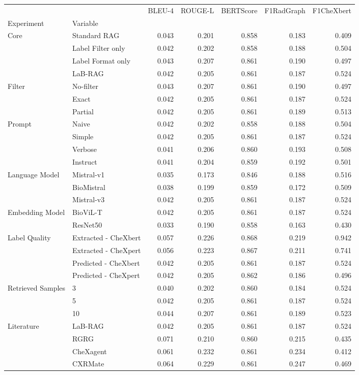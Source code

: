 \begin{tabular}{llrrrrr}
\toprule
 &  & BLEU-4 & ROUGE-L & BERTScore & F1RadGraph & F1CheXbert \\
Experiment & Variable &  &  &  &  &  \\
\midrule
\multirow[t]{4}{*}{Core} & Standard RAG & 0.043 & 0.201 & 0.858 & 0.183 & 0.409 \\
 & Label Filter only & 0.042 & 0.202 & 0.858 & 0.188 & 0.504 \\
 & Label Format only & 0.043 & 0.207 & 0.861 & 0.190 & 0.497 \\
 & LaB-RAG & 0.042 & 0.205 & 0.861 & 0.187 & 0.524 \\
\cline{1-7}
\multirow[t]{3}{*}{Filter} & No-filter & 0.043 & 0.207 & 0.861 & 0.190 & 0.497 \\
 & Exact & 0.042 & 0.205 & 0.861 & 0.187 & 0.524 \\
 & Partial & 0.042 & 0.205 & 0.861 & 0.189 & 0.513 \\
\cline{1-7}
\multirow[t]{4}{*}{Prompt} & Naive & 0.042 & 0.202 & 0.858 & 0.188 & 0.504 \\
 & Simple & 0.042 & 0.205 & 0.861 & 0.187 & 0.524 \\
 & Verbose & 0.041 & 0.206 & 0.860 & 0.193 & 0.508 \\
 & Instruct & 0.041 & 0.204 & 0.859 & 0.192 & 0.501 \\
\cline{1-7}
\multirow[t]{3}{*}{Language Model} & Mistral-v1 & 0.035 & 0.173 & 0.846 & 0.188 & 0.516 \\
 & BioMistral & 0.038 & 0.199 & 0.859 & 0.172 & 0.509 \\
 & Mistral-v3 & 0.042 & 0.205 & 0.861 & 0.187 & 0.524 \\
\cline{1-7}
\multirow[t]{2}{*}{Embedding Model} & BioViL-T & 0.042 & 0.205 & 0.861 & 0.187 & 0.524 \\
 & ResNet50 & 0.033 & 0.190 & 0.858 & 0.163 & 0.430 \\
\cline{1-7}
\multirow[t]{4}{*}{Label Quality} & Extracted - CheXbert & 0.057 & 0.226 & 0.868 & 0.219 & 0.942 \\
 & Extracted - CheXpert & 0.056 & 0.223 & 0.867 & 0.211 & 0.741 \\
 & Predicted - CheXbert & 0.042 & 0.205 & 0.861 & 0.187 & 0.524 \\
 & Predicted - CheXpert & 0.042 & 0.205 & 0.862 & 0.186 & 0.496 \\
\cline{1-7}
\multirow[t]{3}{*}{Retrieved Samples} & 3 & 0.040 & 0.202 & 0.860 & 0.184 & 0.524 \\
 & 5 & 0.042 & 0.205 & 0.861 & 0.187 & 0.524 \\
 & 10 & 0.044 & 0.207 & 0.861 & 0.189 & 0.523 \\
\cline{1-7}
\multirow[t]{4}{*}{Literature} & LaB-RAG & 0.042 & 0.205 & 0.861 & 0.187 & 0.524 \\
 & RGRG & 0.071 & 0.210 & 0.860 & 0.215 & 0.435 \\
 & CheXagent & 0.061 & 0.232 & 0.861 & 0.234 & 0.412 \\
 & CXRMate & 0.064 & 0.229 & 0.861 & 0.247 & 0.469 \\
\cline{1-7}
\bottomrule
\end{tabular}
